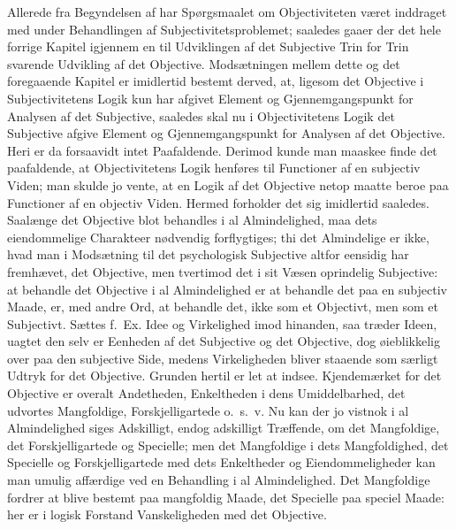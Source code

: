 \documentclass[12pt]{book}
\newcommand{\opage}[1]{\marginnote{\footnotesize\textit{[#1]}}}
\begin{document}
\noindent Allerede fra Begyndelsen af har Spørgsmaalet om Objectiviteten været inddraget med under
Behandlingen af Subjectivitetsproblemet; saaledes gaaer der det hele forrige Kapitel igjennem en til
Udviklingen af det Subjective Trin for Trin svarende Udvikling af det Objective. Modsætningen mellem
dette og det foregaaende Kapitel er imidlertid bestemt derved, at, ligesom det Objective i
Subjectivitetens Logik kun har afgivet Element og Gjennemgangspunkt for Analysen af det Subjective,
saaledes skal nu i Objectivitetens Logik det Subjective afgive Element og Gjennemgangspunkt for
Analysen af det Objective. Heri er da forsaavidt intet Paafaldende. Derimod kunde man maaskee finde
det paafaldende, at Objectivitetens Logik henføres til Functioner af en subjectiv Viden; man skulde jo
vente, at en Logik af det Objective netop maatte beroe paa Functioner af en objectiv Viden. Hermed
forholder det sig imidlertid saaledes. Saalænge det Objective blot behandles i al Almindelighed, maa
dets eiendommelige Charakteer nødvendig forflygtiges; thi det Almindelige er ikke, hvad man i
Modsætning til det psychologisk Subjective altfor eensidig har fremhævet, det Objective, men tvertimod
det i sit Væsen oprindelig Subjective: at behandle det Objective i al Almindelighed er at behandle det
paa en subjectiv Maade, er, med andre Ord, at behandle det, ikke som et Objectivt, men som et
Subjectivt. Sættes f.\ Ex. Idee og Virkelighed imod hinanden, saa træder Ideen, uagtet den selv er
Eenheden af det Subjective og det Objective, dog øieblikkelig over paa den subjective Side, medens
Virkeligheden bliver staaende som særligt Udtryk for det Objective. Grunden hertil er let at indsee.
Kjendemærket for det Objective er overalt Andetheden, Enkeltheden i dens Umiddelbarhed, det udvortes
Mangfoldige, Forskjelligartede o.\ s.\ v. Nu kan der jo vistnok i al Almindelighed siges
\opage{265} Adskilligt, endog adskilligt Træffende, om det Mangfoldige, det Forskjelligartede og Specielle; men det
Mangfoldige i dets Mangfoldighed, det Specielle og Forskjelligartede med dets Enkeltheder og
Eiendommeligheder kan man umulig affærdige ved en Behandling i al Almindelighed. Det Mangfoldige
fordrer at blive bestemt paa mangfoldig Maade, det Specielle paa speciel Maade: her er i logisk
Forstand Vanskeligheden med det Objective.
\end{document}
